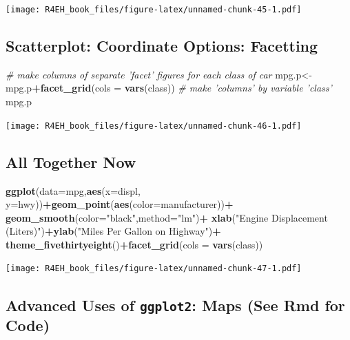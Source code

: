 \documentclass[]{book}
\newenvironment{Shaded}{\begin{snugshade}}{\end{snugshade}}
\newcommand{\KeywordTok}[1]{\textcolor[rgb]{0.13,0.29,0.53}{\textbf{#1}}}
\newcommand{\DataTypeTok}[1]{\textcolor[rgb]{0.13,0.29,0.53}{#1}}
\newcommand{\StringTok}[1]{\textcolor[rgb]{0.31,0.60,0.02}{#1}}
\newcommand{\CommentTok}[1]{\textcolor[rgb]{0.56,0.35,0.01}{\textit{#1}}}
\newcommand{\OperatorTok}[1]{\textcolor[rgb]{0.81,0.36,0.00}{\textbf{#1}}}
\newcommand{\NormalTok}[1]{#1}
\theoremstyle{definition}
\theoremstyle{definition}
\theoremstyle{definition}
\theoremstyle{remark}
\begin{document}
\texttt{[image: R4EH\_book\_files/figure-latex/unnamed-chunk-45-1.pdf]}

\subsection{Scatterplot: Coordinate Options:
Facetting}\label{scatterplot-coordinate-options-facetting}

\begin{Shaded}
\begin{Highlighting}[]
\CommentTok{# make columns of separate 'facet' figures for each class of car}
\NormalTok{mpg.p<-mpg.p}\OperatorTok{+}\KeywordTok{facet_grid}\NormalTok{(}\DataTypeTok{cols =} \KeywordTok{vars}\NormalTok{(class)) }\CommentTok{# make 'columns' by variable 'class'}
\NormalTok{mpg.p}
\end{Highlighting}
\end{Shaded}

\texttt{[image: R4EH\_book\_files/figure-latex/unnamed-chunk-46-1.pdf]}

\subsection{All Together Now}\label{all-together-now}

\begin{Shaded}
\begin{Highlighting}[]
\KeywordTok{ggplot}\NormalTok{(}\DataTypeTok{data=}\NormalTok{mpg,}\KeywordTok{aes}\NormalTok{(}\DataTypeTok{x=}\NormalTok{displ, }\DataTypeTok{y=}\NormalTok{hwy))}\OperatorTok{+}\KeywordTok{geom_point}\NormalTok{(}\KeywordTok{aes}\NormalTok{(}\DataTypeTok{color=}\NormalTok{manufacturer))}\OperatorTok{+}
\StringTok{  }\KeywordTok{geom_smooth}\NormalTok{(}\DataTypeTok{color=}\StringTok{"black"}\NormalTok{,}\DataTypeTok{method=}\StringTok{"lm"}\NormalTok{)}\OperatorTok{+}
\StringTok{  }\KeywordTok{xlab}\NormalTok{(}\StringTok{"Engine Displacement (Liters)"}\NormalTok{)}\OperatorTok{+}\KeywordTok{ylab}\NormalTok{(}\StringTok{"Miles Per Gallon on Highway"}\NormalTok{)}\OperatorTok{+}
\StringTok{  }\KeywordTok{theme_fivethirtyeight}\NormalTok{()}\OperatorTok{+}\KeywordTok{facet_grid}\NormalTok{(}\DataTypeTok{cols =} \KeywordTok{vars}\NormalTok{(class)) }
\end{Highlighting}
\end{Shaded}

\texttt{[image: R4EH\_book\_files/figure-latex/unnamed-chunk-47-1.pdf]}

\subsection{\texorpdfstring{Advanced Uses of \texttt{ggplot2}: Maps (See
Rmd for
Code)}{Advanced Uses of ggplot2: Maps (See Rmd for Code)}}\label{advanced-uses-of-ggplot2-maps-see-rmd-for-code}
\end{document}
